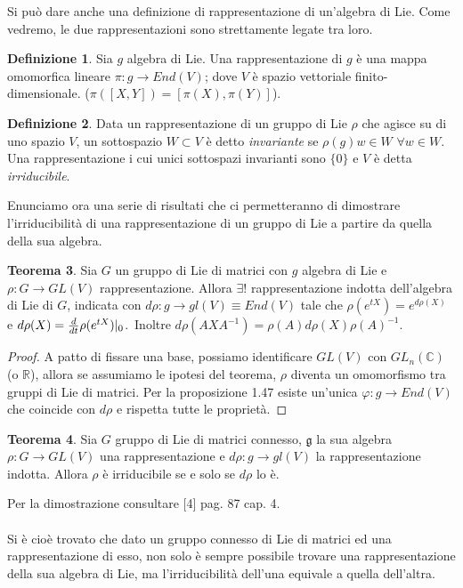 \documentclass[12pt,a4paper]{report}
\theoremstyle{definition}
\newtheorem{Def}{Definizione}[chapter]
\newtheorem{Theo}[Def]{Teorema}
\theoremstyle{definition}
\theoremstyle{definition}
\theoremstyle{remark}
\begin{document}
Si può dare anche una definizione di rappresentazione di un'algebra di Lie. Come vedremo, le due rappresentazioni sono strettamente legate tra loro.
\begin{Def}
	Sia $g$ algebra di Lie. Una rappresentazione di $g$ è una mappa omomorfica lineare $\pi:g\rightarrow End(V)$; dove $V$ è spazio vettoriale finito-dimensionale. ($\pi([X,Y])=[\pi(X),\pi(Y)]$).
\end{Def}

\begin{Def}
	Data un rappresentazione di un gruppo di Lie $\rho$ che agisce su di uno spazio $V$, un sottospazio $W\subset V$ è detto \textit{invariante} se $\rho(g)w\in W$ $\forall w\in W$.\\
	Una rappresentazione i cui unici sottospazi invarianti sono $\{0\}$ e $V$ è detta \textit{irriducibile}.
\end{Def}
Enunciamo ora una serie di risultati che ci permetteranno di dimostrare l'irriducibilità di una rappresentazione di un gruppo di Lie a partire da quella della sua algebra.
\begin{Theo}
	Sia $G$ un gruppo di Lie di matrici con $g$ algebra di Lie e $\rho:G\rightarrow GL(V)$ rappresentazione. Allora $\exists!$ rappresentazione indotta dell'algebra di Lie di $G$, indicata con $d\rho:g\rightarrow gl(V)\equiv End(V)$ tale che $\rho(e^{tX})=e^{d\rho(X)}$ e $d\rho(X)={d\over dt}\rho(e^{tX})|_0$.\
	Inoltre $d\rho(AXA^{-1})=\rho(A)d\rho(X)\rho(A)^{-1}$.	
\end{Theo}
\begin{proof}
	A patto di fissare una base, possiamo identificare $GL(V)$ con $GL_n(\mathbb{C})$ (o $\mathbb{R}$), allora se assumiamo le ipotesi del teorema, $\rho$ diventa un omomorfismo tra gruppi di Lie di matrici. Per la proposizione 1.47 esiste un'unica $\varphi:g\rightarrow End(V)$ che coincide con $d\rho$ e rispetta tutte le proprietà.
\end{proof}
\begin{Theo}
	Sia $G$ gruppo di Lie di matrici connesso, $\mathfrak{g}$ la sua algebra $\rho:G\rightarrow GL(V)$ una rappresentazione e $d\rho:g\rightarrow gl(V)$ la rappresentazione indotta. Allora $\rho$ è irriducibile se e solo se $d\rho$ lo è.
\end{Theo}
Per la dimostrazione consultare [4] pag. 87 cap. 4.\\
\\
Si è cioè trovato che dato un gruppo connesso di Lie di matrici ed una rappresentazione di esso, non solo è sempre possibile trovare una rappresentazione della sua algebra di Lie, ma l'irriducibilità dell'una equivale a quella dell'altra.
\end{document}
